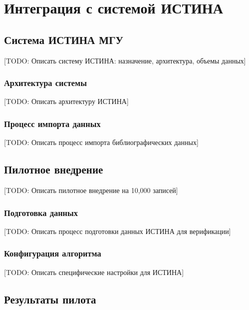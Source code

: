 
\chapter{Интеграция с системой ИСТИНА}
\label{ch:istina}

\section{Система ИСТИНА МГУ}
\label{sec:istina:overview}

[TODO: Описать систему ИСТИНА: назначение, архитектура, объемы данных]

\subsection{Архитектура системы}
\label{subsec:istina:architecture}

[TODO: Описать архитектуру ИСТИНА]

\subsection{Процесс импорта данных}
\label{subsec:istina:import}

[TODO: Описать процесс импорта библиографических данных]

\section{Пилотное внедрение}
\label{sec:istina:pilot}

[TODO: Описать пилотное внедрение на 10,000 записей]

\subsection{Подготовка данных}
\label{subsec:istina:data_prep}

[TODO: Описать процесс подготовки данных ИСТИНА для верификации]

\subsection{Конфигурация алгоритма}
\label{subsec:istina:configuration}

[TODO: Описать специфические настройки для ИСТИНА]

\section{Результаты пилота}
\label{sec:istina:results}


